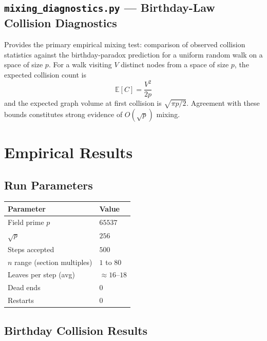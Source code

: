 \documentclass[11pt]{article}
\theoremstyle{definition}
\theoremstyle{remark}
\newcommand{\BigO}[1]{O\!\left(#1\right)}
\begin{document}
\subsection{\texttt{mixing\_diagnostics.py} — Birthday-Law Collision Diagnostics}

Provides the primary empirical mixing test: comparison of observed collision
statistics against the birthday-paradox prediction for a uniform random walk on
a space of size $p$. For a walk visiting $V$ distinct nodes from a space of
size $p$, the expected collision count is
\[
  \mathbb{E}[C] = \frac{V^2}{2p}
\]
and the expected graph volume at first collision is $\sqrt{\pi p/2}$. Agreement
with these bounds constitutes strong evidence of $\BigO{\sqrt{p}}$ mixing.

\section{Empirical Results}
\label{sec:results}

\subsection{Run Parameters}

\begin{center}
\begin{tabular}{ll}
  \toprule
  Parameter & Value \\
  \midrule
  Field prime $p$ & $65537$ \\
  $\sqrt{p}$ & $256$ \\
  Steps accepted & $500$ \\
  $n$ range (section multiples) & $1$ to $80$ \\
  Leaves per step (avg) & ${\approx}16$--$18$ \\
  Dead ends & $0$ \\
  Restarts & $0$ \\
  \bottomrule
\end{tabular}
\end{center}

\subsection{Birthday Collision Results}
\end{document}
